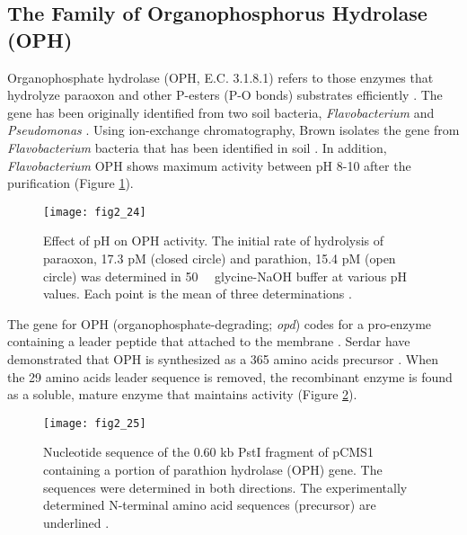\begin{refsection}
\subsection{The Family of Organophosphorus Hydrolase (OPH)}

Organophosphate hydrolase (OPH, E.C. 3.1.8.1) refers to those enzymes that
hydrolyze paraoxon and other P-esters (P-O bonds) substrates efficiently
\cite{Hanusa2011}. The gene has been originally identified from two soil bacteria,
\emph{Flavobacterium} and \emph{Pseudomonas} \cite{Harper1988,McDaniel1988a}.
Using ion-exchange chromatography, Brown  isolates the gene
from \emph{Flavobacterium} bacteria that has been identified in soil
\cite{Brown1980}. In addition, \emph{Flavobacterium} OPH shows maximum
activity between pH 8-10 after the purification (Figure \ref{fig:first-oph}). 
\begin{figure}[htbp] \centering \texttt{[image: fig2\_24]}
    \caption[Effect of pH on OPH activity. The initial rate of hydrolysis of
    paraoxon, 17.3 pM  (closed circle) and parathion, 15.4 pM (open circle) was
    determined in \SI{50}{\milli\Molar} glycine-NaOH buffer at various pH
    values.  Each point is the mean of three determinations.] {Effect of pH on
        OPH activity.  The initial rate of hydrolysis of paraoxon, 17.3 pM
        (closed circle) and parathion, 15.4 pM (open circle) was determined in
        \SI{50}{\milli\Molar} glycine-NaOH buffer at various pH values. Each
        point is the mean of three determinations \cite{Brown1980}.}
    \label{fig:first-oph}
\end{figure}

The gene for OPH (organophosphate-degrading; \emph{opd})
codes for a pro-enzyme containing a leader peptide that attached to the
membrane \cite{Hanusa2011}. Serdar  have demonstrated that OPH is
synthesized as a 365 amino acids precursor \cite{Serdar1989}. When the 29 amino
acids leader sequence is removed, the recombinant enzyme is found as a
soluble, mature enzyme that maintains activity (Figure \ref{fig:pte-precusor}). 
\begin{figure}[htbp] \centering \texttt{[image: fig2\_25]}
    \caption[Nucleotide sequence of the 0.60 kb PstI fragment of pCMS1
    containing a portion of parathion hydrolase (OPH) gene. The sequences were
determined in both directions. The experimentally determined N-terminal amino
acid sequences (precursor) are underlined.] {Nucleotide sequence of the 0.60 kb
    PstI fragment of pCMS1 containing a portion of parathion hydrolase (OPH)
    gene. The sequences were determined in both directions. The experimentally
    determined N-terminal amino acid sequences (precursor) are underlined
    \cite{Serdar1989}.}
    \label{fig:pte-precusor}
\end{figure}


\end{refsection}
